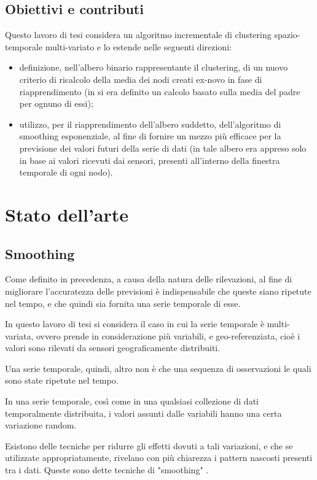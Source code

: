 \documentclass[12pt,a4paper,oneside,openright]{book}
\begin{document}
\section{Obiettivi e contributi}
Questo lavoro di tesi considera un algoritmo incrementale di clustering spazio-temporale multi-variato e lo estende nelle seguenti direzioni: 
\begin{itemize}
\item definizione, nell’albero binario rappresentante il clustering, di un nuovo criterio di ricalcolo della media dei nodi creati ex-novo in fase di riapprendimento (in \cite{donato} si era definito un calcolo basato sulla media del padre per ognuno di essi);
\item utilizzo, per il riapprendimento dell’albero suddetto, dell’algoritmo di smoothing esponenziale, al fine di fornire un mezzo più efficace per la previsione dei valori futuri della serie di dati (in \cite{donato} tale albero era appreso solo in base ai valori ricevuti dai sensori, presenti all’interno della finestra temporale di ogni nodo).
\end{itemize}
\chapter{Stato dell'arte}
\section{Smoothing}
Come definito in precedenza, a causa della natura delle rilevazioni, al fine di migliorare l'accuratezza delle previsioni è indispensabile che queste siano ripetute nel tempo, e che quindi sia fornita una serie temporale di esse.

In questo lavoro di tesi si considera il caso in cui la serie temporale è multi-variata, ovvero prende in considerazione più variabili, e geo-referenziata, cioè i valori sono rilevati da sensori geograficamente distribuiti.

Una serie temporale, quindi, altro non è che una sequenza di osservazioni le quali sono state ripetute nel tempo. 

In una serie temporale, così come in una qualsiasi collezione di dati temporalmente distribuita, i valori assunti dalle variabili hanno una certa variazione random. 

Esistono delle tecniche per ridurre gli effetti dovuti a tali variazioni, e che se utilizzate appropriatamente, rivelano con più chiarezza i pattern nascosti presenti tra i dati. Queste sono dette tecniche di "smoothing" \cite{5a}. 
\end{document}
